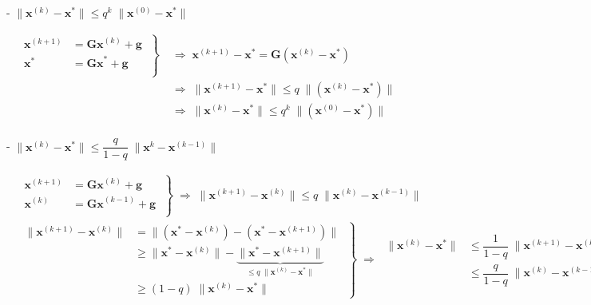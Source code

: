 \documentclass[12pt, UTF8, nofonts]{ctexart}
\begin{document}
- $\|\boldsymbol{x}^{(k)}-\boldsymbol{x}^{\ast}\|\leq q^k\;\|\boldsymbol{x}^{(0)}-\boldsymbol{x}^{\ast}\|$

\[
    \begin{aligned}
        \left.\begin{aligned}
            \boldsymbol{x}^{(k+1)} &= \boldsymbol{Gx}^{(k)}+\boldsymbol{g} \\
            \boldsymbol{x}^{\ast} &= \boldsymbol{Gx}^{\ast}+\boldsymbol{g} \\
        \end{aligned} \;\right\}\; &\Rightarrow \;
        \boldsymbol{x}^{(k+1)}-\boldsymbol{x}^{\ast} = \boldsymbol{G}(\boldsymbol{x}^{(k)}-\boldsymbol{x}^{\ast}) \\
        &\Rightarrow \;
        \|\boldsymbol{x}^{(k+1)}-\boldsymbol{x}^{\ast}\| \leq q\; \|(\boldsymbol{x}^{(k)}-\boldsymbol{x}^{\ast})\| \\
        &\Rightarrow \;
        \|\boldsymbol{x}^{(k)}-\boldsymbol{x}^{\ast}\| \leq q^k\; \|(\boldsymbol{x}^{(0)}-\boldsymbol{x}^{\ast})\| \\
    \end{aligned}
\]

- $\|\boldsymbol{x}^{(k)}-\boldsymbol{x}^{\ast}\|\leq\dfrac{q}{1-q}\;\|\boldsymbol{x}^{k}-\boldsymbol{x}^{(k-1)}\|$

\begin{eqnarray*}
    & \left.\begin{aligned}
        \boldsymbol{x}^{(k+1)} &= \boldsymbol{Gx}^{(k)}+\boldsymbol{g} \\
        \boldsymbol{x}^{(k)} &= \boldsymbol{Gx}^{(k-1)}+\boldsymbol{g} \\
    \end{aligned} \;\right\}\; \Rightarrow \;
    \|\boldsymbol{x}^{(k+1)}-\boldsymbol{x}^{(k)}\| \leq q \; \|\boldsymbol{x}^{(k)}-\boldsymbol{x}^{(k-1)}\| \\
    & \left.\begin{aligned}
        \|\boldsymbol{x}^{(k+1)}-\boldsymbol{x}^{(k)}\| &=
        \|(\boldsymbol{x}^{\ast}-\boldsymbol{x}^{(k)})-(\boldsymbol{x}^{\ast}-\boldsymbol{x}^{(k+1)})\| \\
        &\geq \|\boldsymbol{x}^{\ast}-\boldsymbol{x}^{(k)}\| -
        \underbrace{\|\boldsymbol{x}^{\ast}-\boldsymbol{x}^{(k+1)}\|}_{\leq q\;\|\boldsymbol{x}^{(k)}-\boldsymbol{x}^{\ast}\|} \\
        &\geq (1-q)\;\|\boldsymbol{x}^{(k)}-\boldsymbol{x}^{\ast}\|
    \end{aligned} \;\right\}\; \Rightarrow \;
    \begin{aligned}
        \|\boldsymbol{x}^{(k)}-\boldsymbol{x}^{\ast}\| &\leq
        \dfrac{1}{1-q} \; \|\boldsymbol{x}^{(k+1)}-\boldsymbol{x}^{(k)}\| \\
        &\leq \dfrac{q}{1-q} \; \|\boldsymbol{x}^{(k)}-\boldsymbol{x}^{(k-1)}\|
    \end{aligned}
\end{eqnarray*}
\end{document}
